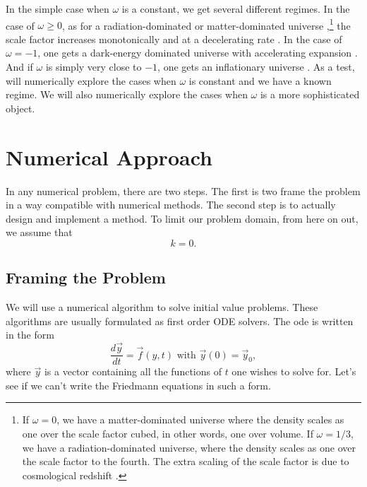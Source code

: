 \documentclass[]{article}
\newcommand{\myvec}[1]{\vec{#1}} %
\newcommand{\diff}[2]{\frac{d #1}{d #2}}
\begin{document}
In the simple case when $\omega$ is a constant, we get several
different regimes. In the case of $\omega \geq 0$, as for a
radiation-dominated or matter-dominated universe
\cite{MisnerThorneWheeler,Carroll,Kempf},\footnote{If $\omega=0$, we
  have a matter-dominated universe where the density scales as one
  over the scale factor cubed, in other words, one over volume. If
  $\omega=1/3$, we have a radiation-dominated universe, where the
  density scales as one over the scale factor to the fourth. The extra
  scaling of the scale factor is due to cosmological redshift
  \cite{Carroll,Kempf}.} the scale factor increases monotonically and
at a decelerating rate \cite{MisnerThorneWheeler,Carroll,Kempf}. In
the case of $\omega = -1$, one gets a dark-energy dominated universe
with accelerating expansion
\cite{MisnerThorneWheeler,Carroll,Kempf}. And if $\omega$ is simply
very close to $-1$, one gets an inflationary universe
\cite{MisnerThorneWheeler,Carroll,Kempf}. As a test, will numerically
explore the cases when $\omega$ is constant and we have a known
regime. We will also numerically explore the cases when $\omega$ is a
more sophisticated object.

\section{Numerical Approach}
\label{sec:numerical:approach}

In any numerical problem, there are two steps. The first is two frame
the problem in a way compatible with numerical methods. The second
step is to actually design and implement a method. To limit our
problem domain, from here on out, we assume that
\begin{equation}
  \label{eq:def:k}
  k = 0.
\end{equation}

\subsection{Framing the Problem}
\label{subsec:framing:the:problem}

We will use a numerical algorithm to solve initial value
problems. These algorithms are usually formulated as first order ODE
solvers. The ode is written in the form
\begin{equation}
  \label{eq:ode:formulation}
  \diff{\myvec{y}}{t} = \myvec{f}(y,t)\text{ with }\myvec{y}(0) = \myvec{y}_0,
\end{equation}
where $\myvec{y}$ is a vector containing all the functions of $t$ one
wishes to solve for. Let's see if we can't write the Friedmann
equations in such a form. 
\end{document}
